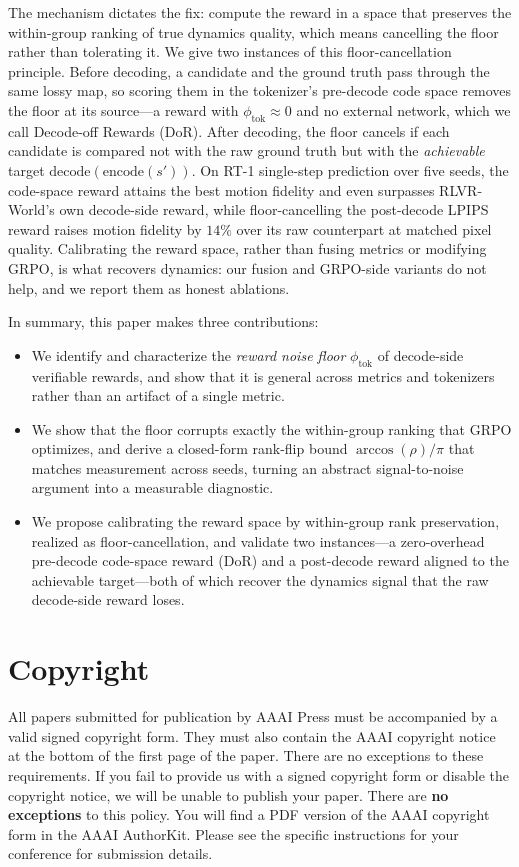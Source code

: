 \documentclass[letterpaper]{article} %
\begin{document}
The mechanism dictates the fix: compute the reward in a space that preserves the within-group ranking of true dynamics quality, which means cancelling the floor rather than tolerating it. We give two instances of this floor-cancellation principle. Before decoding, a candidate and the ground truth pass through the same lossy map, so scoring them in the tokenizer's pre-decode code space removes the floor at its source---a reward with $\phi_{\text{tok}}\!\approx\!0$ and no external network, which we call Decode-off Rewards (DoR). After decoding, the floor cancels if each candidate is compared not with the raw ground truth but with the \emph{achievable} target $\mathrm{decode}(\mathrm{encode}(s'))$. On RT-1 single-step prediction over five seeds, the code-space reward attains the best motion fidelity and even surpasses RLVR-World's own decode-side reward, while floor-cancelling the post-decode LPIPS reward raises motion fidelity by $14\%$ over its raw counterpart at matched pixel quality. Calibrating the reward space, rather than fusing metrics or modifying GRPO, is what recovers dynamics: our fusion and GRPO-side variants do not help, and we report them as honest ablations.

In summary, this paper makes three contributions:
\begin{itemize}
\item We identify and characterize the \emph{reward noise floor} $\phi_{\text{tok}}$ of decode-side verifiable rewards, and show that it is general across metrics and tokenizers rather than an artifact of a single metric.
\item We show that the floor corrupts exactly the within-group ranking that GRPO optimizes, and derive a closed-form rank-flip bound $\arccos(\rho)/\pi$ that matches measurement across seeds, turning an abstract signal-to-noise argument into a measurable diagnostic.
\item We propose calibrating the reward space by within-group rank preservation, realized as floor-cancellation, and validate two instances---a zero-overhead pre-decode code-space reward (DoR) and a post-decode reward aligned to the achievable target---both of which recover the dynamics signal that the raw decode-side reward loses.
\end{itemize}

\section{Copyright}
All papers submitted for publication by AAAI Press must be accompanied by a valid signed copyright form. They must also contain the AAAI copyright notice at the bottom of the first page of the paper. There are no exceptions to these requirements. If you fail to provide us with a signed copyright form or disable the copyright notice, we will be unable to publish your paper. There are \textbf{no exceptions} to this policy. You will find a PDF version of the AAAI copyright form in the AAAI AuthorKit. Please see the specific instructions for your conference for submission details.
\end{document}
